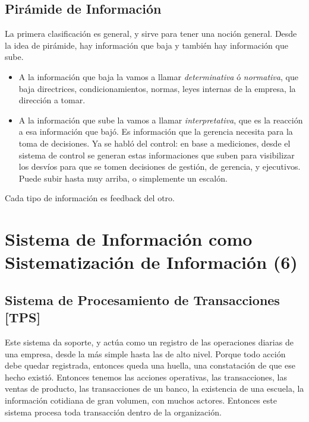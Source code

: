 \hypertarget{piruxe1mide-de-informaciuxf3n}{%
\subsection{Pirámide de
Información}\label{piruxe1mide-de-informaciuxf3n}}

La primera clasificación es general, y sirve para tener una noción
general. Desde la idea de pirámide, hay información que baja y también
hay información que sube. 
\begin{itemize}
\item A la información que baja la vamos a llamar
\emph{determinativa} ó \emph{normativa}, que baja directrices,
condicionamientos, normas, leyes internas de la empresa, la dirección a
tomar. 
\item A la información que sube la vamos a llamar
\emph{interpretativa}, que es la reacción a esa información que bajó. Es
información que la gerencia necesita para la toma de decisiones. Ya se
habló del control: en base a mediciones, desde el sistema de control se
generan estas informaciones que suben para visibilizar los desvíos para
que se tomen decisiones de gestión, de gerencia, y ejecutivos. Puede
subir hasta muy arriba, o simplemente un escalón. 
\end{itemize}

Cada tipo de información es feedback del otro.

\hypertarget{sistema-de-informaciuxf3n-como-sistematizaciuxf3n-de-informaciuxf3n-6}{%
\section{Sistema de Información como Sistematización de Información
(6)}\label{sistema-de-informaciuxf3n-como-sistematizaciuxf3n-de-informaciuxf3n-6}}

\hypertarget{sistema-de-procesamiento-de-transacciones-tps}{%
\subsection{Sistema de Procesamiento de Transacciones
{[}TPS{]}}\label{sistema-de-procesamiento-de-transacciones-tps}}

Este sistema da soporte, y actúa como un registro de las operaciones
diarias de una empresa, desde la más simple hasta las de alto nivel.
Porque todo acción debe quedar registrada, entonces queda una huella,
una constatación de que ese hecho existió. Entonces tenemos las acciones
operativas, las transacciones, las ventas de producto, las transacciones
de un banco, la existencia de una escuela, la información cotidiana de
gran volumen, con muchos actores. Entonces este sistema procesa toda
transacción dentro de la organización.

